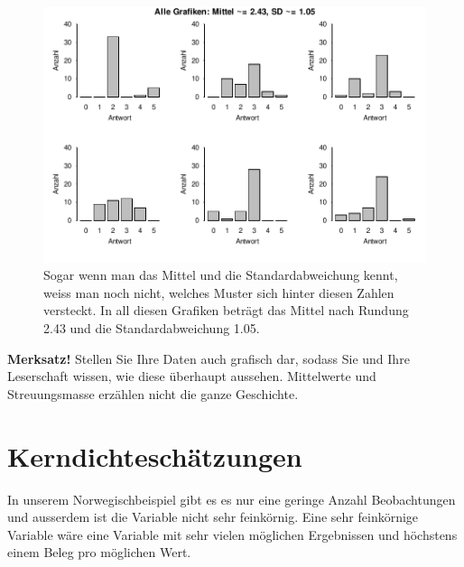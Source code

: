 \documentclass[oneside, 10pt]{book}\usepackage[]{graphicx}\usepackage[]{xcolor}
\newenvironment{knitrout}{}{} %
\begin{document}
\begin{knitrout}
\color{fgcolor}\begin{figure}[tp]

{\centering \includegraphics[width=\textwidth]{figs/unnamed-chunk-111-1} 

}

\caption{Sogar wenn man das Mittel und die Standardabweichung kennt, weiss man noch nicht, welches Muster sich hinter diesen Zahlen versteckt. In all diesen Grafiken beträgt das Mittel nach Rundung 2.43 und die Standardabweichung 1.05.\label{fig:samemeansd}}\label{fig:unnamed-chunk-111}
\end{figure}

\end{knitrout}

\medskip

\begin{framed}
\noindent \textbf{Merksatz!} Stellen Sie Ihre Daten auch grafisch dar, sodass Sie und Ihre Leserschaft
wissen, wie diese überhaupt aussehen. Mittelwerte und Streuungsmasse
erzählen nicht die ganze Geschichte.
\end{framed}

\section{Kerndichteschätzungen}
In unserem Norwegischbeispiel gibt es es nur eine geringe Anzahl Beobachtungen
und ausserdem ist die Variable nicht sehr feinkörnig.
Eine sehr feinkörnige Variable wäre eine Variable mit sehr vielen möglichen Ergebnissen
und höchstens einem Beleg pro möglichen Wert.
\end{document}
